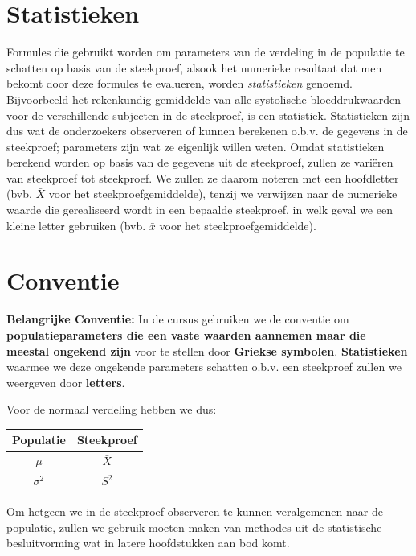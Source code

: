 \documentclass[
  12pt,dutch,coursenotes]{book}
\begin{document}
\hypertarget{statistieken}{%
\section{Statistieken}\label{statistieken}}

Formules die gebruikt worden om parameters van de verdeling in de populatie te schatten op basis van de
steekproef, alsook het numerieke resultaat dat men bekomt door deze formules
te evalueren, worden \emph{statistieken} genoemd.
Bijvoorbeeld het
rekenkundig gemiddelde van alle systolische bloeddrukwaarden voor de verschillende subjecten
in de steekproef, is een statistiek. Statistieken zijn dus wat
de onderzoekers observeren of kunnen berekenen o.b.v. de gegevens in de
steekproef; parameters zijn wat ze eigenlijk willen weten.
Omdat statistieken berekend worden op basis van de gegevens uit de steekproef, zullen ze variëren van steekproef tot steekproef.
We zullen ze daarom noteren met een hoofdletter (bvb. \(\bar X\) voor het steekproefgemiddelde), tenzij we verwijzen naar de numerieke waarde die gerealiseerd wordt in een bepaalde steekproef, in welk geval we een kleine letter gebruiken (bvb. \(\bar x\) voor het steekproefgemiddelde).

\hypertarget{conventie}{%
\section{Conventie}\label{conventie}}

\textbf{Belangrijke Conventie:} In de cursus gebruiken we de conventie om \textbf{populatieparameters die een vaste waarden aannemen maar die meestal ongekend zijn} voor te stellen door \textbf{Griekse symbolen}. \textbf{Statistieken} waarmee we deze ongekende parameters schatten o.b.v. een steekproef zullen we weergeven door \textbf{letters}.

Voor de normaal verdeling hebben we dus:

\begin{longtable}[]{@{}cc@{}}
\toprule()
Populatie & Steekproef \\
\midrule()
\endhead
\(\mu\) & \(\bar X\) \\
\(\sigma^2\) & \(S^2\) \\
\bottomrule()
\end{longtable}

Om hetgeen we in de steekproef observeren te kunnen veralgemenen naar de populatie, zullen we gebruik moeten maken van methodes uit de statistische besluitvorming wat in latere hoofdstukken aan bod komt.
\end{document}
